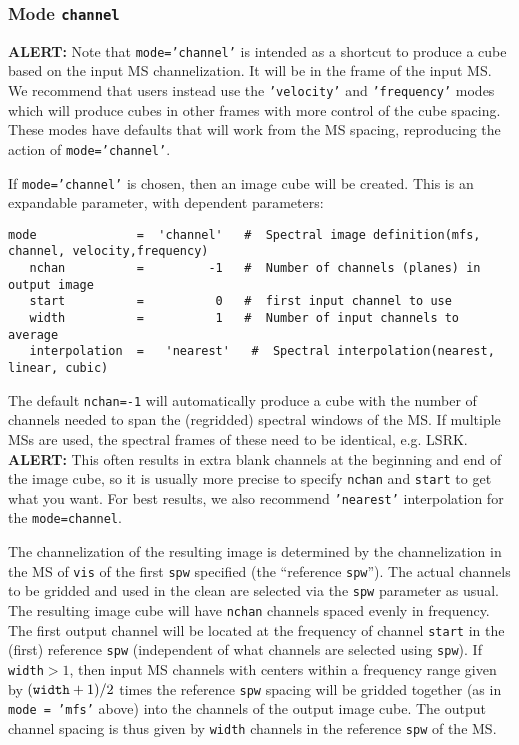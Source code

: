 \subsubsection{Mode {\tt channel} }
\label{section:im.pars.mode.channel}

{\bf ALERT:} Note that {\tt mode='channel'} is intended as a shortcut
to produce a cube based on the input MS channelization.  It will be in
the frame of the input MS.  We recommend that users instead use the
{\tt 'velocity'} and {\tt 'frequency'} modes which will produce cubes
in other frames with more control of the cube spacing.  These modes
have defaults that will work from the MS spacing, reproducing the
action of {\tt mode='channel'}.

If {\tt mode='channel'} is chosen, then an image cube will be
created. This is an expandable parameter, with dependent parameters:
\small
\begin{verbatim}
mode              =  'channel'   #  Spectral image definition(mfs, channel, velocity,frequency)
   nchan          =         -1   #  Number of channels (planes) in output image
   start          =          0   #  first input channel to use
   width          =          1   #  Number of input channels to average
   interpolation  =   'nearest'   #  Spectral interpolation(nearest, linear, cubic)
\end{verbatim}
\normalsize The default {\tt nchan=-1} will automatically produce a
cube with the number of channels needed to span the (regridded)
spectral windows of the MS. If multiple MSs are used, the spectral
frames of these need to be identical, e.g. LSRK.  {\bf ALERT:} This
often results in extra blank channels at the beginning and end of the
image cube, so it is usually more precise to specify {\tt nchan} and
{\tt start} to get what you want. For best results, we also recommend
{\tt 'nearest'} interpolation for the {\tt mode=channel}.

The channelization of the resulting image is determined by the
channelization in the MS of {\tt vis} of the first {\tt spw} specified
(the ``reference {\tt spw}''). The actual channels to be gridded and
used in the clean are selected via the {\tt spw} parameter as usual.
The resulting image cube will have {\tt nchan} channels spaced evenly
in frequency.  The first output channel will be located at the
frequency of channel {\tt start} in the (first) reference {\tt spw}
(independent of what channels are selected using {\tt spw}).  If {\tt
  width}$ > 1$, then input MS channels with centers within a frequency
range given by $({\tt width}+1)/2$ times the reference {\tt spw}
spacing will be gridded together (as in {\tt mode = 'mfs'} above) into
the channels of the output image cube.  The output channel spacing is
thus given by {\tt width} channels in the reference {\tt spw} of the
MS.
  
